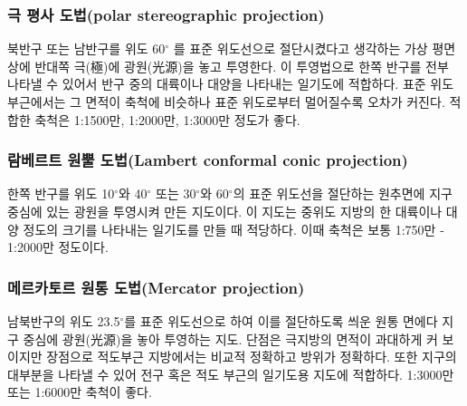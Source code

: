\subsubsection{극 평사 도법(polar stereographic projection)}
북반구 또는 남반구를 위도 60$^{\circ}$ 를 표준 위도선으로 절단시켰다고 생각하는 가상 평면 상에 반대쪽 극(極)에 광원(光源)을 놓고 투영한다. 이 투영법으로 한쪽 반구를 전부 나타낼 수 있어서 반구 중의 대륙이나 대양을 나타내는 일기도에 적합하다. 표준 위도 부근에서는 그 면적이 축척에 비슷하나 표준 위도로부터 멀어질수록 오차가 커진다. 적합한 축척은 1:1500만, 1:2000만, 1:3000만 정도가 좋다.

\subsubsection{람베르트 원뿔 도법(Lambert conformal conic projection)}
한쪽 반구를 위도 10$^{\circ}$와 40$^{\circ}$ 또는 30$^{\circ}$와 60$^{\circ}$의 표준 위도선을 절단하는 원추면에 지구 중심에 있는 광원을 투영시켜 만든 지도이다. 이 지도는 중위도 지방의 한 대륙이나 대양 정도의 크기를 나타내는 일기도를 만들 때 적당하다. 이때 축척은 보통 1:750만 - 1:2000만 정도이다.





\subsubsection{메르카토르 원통 도법(Mercator projection)}
남북반구의 위도 23.5$^{\circ}$를 표준 위도선으로 하여 이를 절단하도록 씌운 원통 면에다 지구 중심에 광원(光源)을 놓아 투영하는 지도. 단점은 극지방의 면적이 과대하게 커 보이지만 장점으로 적도부근 지방에서는 비교적 정확하고 방위가 정확하다. 또한 지구의 대부분을 나타낼 수 있어 전구 혹은 적도 부근의 일기도용 지도에 적합하다. 1:3000만 또는 1:6000만 축척이 좋다.

